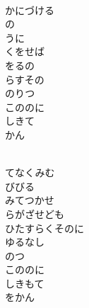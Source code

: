 \documentclass[10pt,b5j]{tarticle} %
\begin{document}
\begin{enumerate}
\begin{minipage}[c]{\blocksize}
        \vspace{\linespace}
        \item~\\
        かにづける\\
        の\\
        うに\\
        くをせば\\
        をるの\\
        らすその\\
        のりつ\\
        こののに\\
        しきて\\
        かん
        
        \vspace{\linespace}
        \item~\\
        てなくみむ\\
        びびる\\
        みてつかせ\\
        らがざせども\\
        ひたすらくそのに\\
        ゆるなし\\
        のつ\\
        こののに\\
        しきもて\\
        をかん
    
    \end{minipage}
\end{enumerate} %
\end{document}
